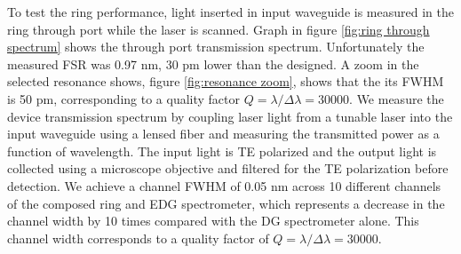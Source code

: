 \documentclass[12pt,twoside,english]{book}
\renewcommand{\~}{\perispomeni}%
\numberwithin{equation}{section}
\numberwithin{figure}{section}
\begin{document}
To test the ring performance, light inserted in input waveguide is measured in the ring through port while the laser is scanned. Graph in figure \ref{fig:ring through spectrum} shows the through port transmission spectrum. Unfortunately the measured FSR was 0.97 nm, 30 pm lower than the designed. A zoom in the selected resonance shows, figure \ref{fig:resonance zoom}, shows that the its FWHM is 50 pm, corresponding to a quality factor $Q=\lambda/\Delta\lambda=30000$. 
We measure the device transmission spectrum by coupling laser light from a tunable laser into the input waveguide using a lensed fiber and measuring the transmitted power as a function of wavelength. The input light is TE polarized and the output light is collected using a microscope objective and filtered for the TE polarization before detection. We achieve a channel \gls{FWHM} of 0.05 nm across 10 different channels of the composed ring and EDG spectrometer, which represents a decrease in the channel width by 10 times compared with the DG spectrometer alone. This channel width corresponds to a quality factor of $Q=\lambda/\Delta\lambda=30000$.
\end{document}
